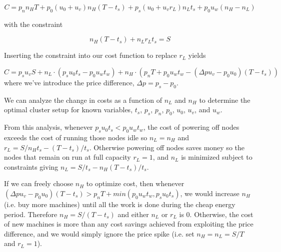 \begin{equation}
	C = p_n n_H T + p_0 (u_0 + u_v) n_H (T-t_s) + p_s (u_0 + u_v r_L) n_L t_s + p_0 u_w (n_H-n_L)
\end{equation}

with the constraint

\begin{equation}
n_H (T-t_s) + n_L r_L t_s = S
\end{equation}

Inserting the constraint into our cost function to replace $r_L$ yields 

\begin{equation}
C = p_s u_v S + n_L \cdot( p_s u_0 t_s - p_0 u_w t_w) + n_H \cdot (p_n T + p_0 u_w t_w -(\Delta p u_v - p_0 u_0)(T-t_s))
\end{equation}
where we've introduce the price difference, $\Delta p = p_s - p_0$.

We can analyze the change in costs as a function of $n_L$ and $n_H$ to determine the optimal cluster setup for known variables, $t_s$, $p_s$, $p_n$, $p_0$, $u_0$, $u_v$, and $u_w$. 

From this analysis, whenever $ p_s u_0 t_s < p_0 u_w t_w$, the cost of powering off nodes exceeds the cost of running those nodes idle so $n_L = n_H$ and $r_L = S/n_H t_s - (T-t_s)/t_s$. Otherwise powering off nodes saves money so the nodes that remain on run at full capacity $r_L = 1$, and $n_L$ is minimized subject to constraints giving $n_L = S/t_s - n_H(T-t_s)/t_s$.

If we can freely choose $n_H$ to optimize cost, then whenever $(\Delta p u_v - p_0 u_0)(T-t_s) > p_n T + min(p_0 u_w t_w,p_s u_0 t_s)$, we would increase $n_H$ (i.e. buy more machines) until all the work is done during the cheap energy period. Therefore $n_H = S/(T-t_s)$ and either $n_L$ or $r_L$ is $0$.  Otherwise, the cost of new machines is more than any cost savings achieved from exploiting the price difference, and we would simply ignore the price spike (i.e. set $n_H = n_L = S/T$ and $r_L = 1$).

